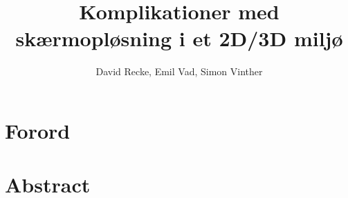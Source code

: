 \documentclass[10pt,a4paper,draft]{article}
\author{David Recke, Emil Vad, Simon Vinther}
\title{Komplikationer med skærmopløsning i et 2D/3D miljø}
\begin{document}
	\maketitle
	
	\section{Forord}		
		

	\section{Abstract}
		
\end{document}
